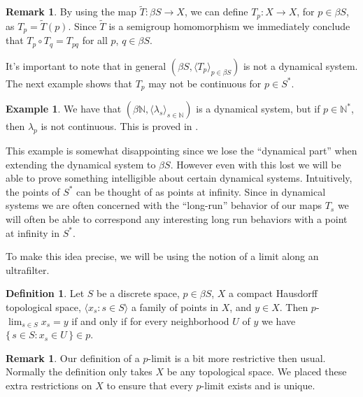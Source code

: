 \documentclass[12pt]{article}
\theoremstyle{plain}
\theoremstyle{definition}
\newtheorem{defn}[thm]{Definition}
\newtheorem{example}[thm]{Example}
\newtheorem{rmk}[thm]{Remark}
\newcommand{\la}{\langle}
\newcommand{\ra}{\rangle}
\newcommand{\bbN}{\mathbb{N}}
\begin{document}
  \begin{rmk}
    By using the map $\widetilde{T} : \beta S \to X$, we can define
    $T_p : X \to X$, for $p \in \beta S$, as $T_p =
    \widetilde{T}(p)$. 
    Since $\widetilde{T}$ is a semigroup homomorphism we immediately
    conclude that $T_p \circ T_q = T_{pq}$ for all $p$, $q \in \beta
    S$.
   \end{rmk}

It's important to note that in general $(\beta S, \la T_p \ra_{p
  \in \beta S})$ is not a dynamical system. 
The next example shows that $T_p$ may not be continuous for $p \in S^*$.
 

  \begin{example}
    We have that $(\beta\bbN, \la \lambda_s \ra_{s\in\bbN})$ is a
    dynamical system, but if $p \in \bbN^*$, then $\lambda_p$ is not
    continuous.
    This is proved in \cite[Theorem 6.10 and Remark 6.11]{Hindman:1998fk}.
   \end{example}

This example is somewhat disappointing since we lose the ``dynamical
part'' when extending the dynamical system to $\beta S$.
However even with this lost we will be able to prove something
intelligible about certain dynamical systems. 
Intuitively, the points of $S^*$ can be thought of as points at
infinity. 
Since in dynamical systems we are often concerned with the
``long-run'' behavior of our maps $T_s$ we will often be able to
correspond any interesting long run behaviors with a point at infinity
in $S^*$.

To make this idea precise, we will be using the notion of a limit
along an ultrafilter. 

  \begin{defn}
    \label{defn:plim}
    Let $S$ be a discrete space, $p \in \beta S$, $X$ a compact
    Hausdorff topological space, $\la x_s : s \in S \ra$ a family
    of points in $X$, and $y \in X$.
    Then \hbox{$p$-$\displaystyle\lim_{s \in S} x_s = y$} if and only
    if for every
    neighborhood $U$ of $y$ we have $\{\, s \in S : x_s \in U \,\} \in p$.
  \end{defn}

  \begin{rmk}
    Our definition of a \hbox{$p$-limit} is a bit more restrictive
    then usual.
    Normally the definition only takes $X$ be any topological space.
    We placed these extra restrictions on $X$ to ensure that every
    \hbox{$p$-limit} exists and is unique.
  \end{rmk}
\end{document}
